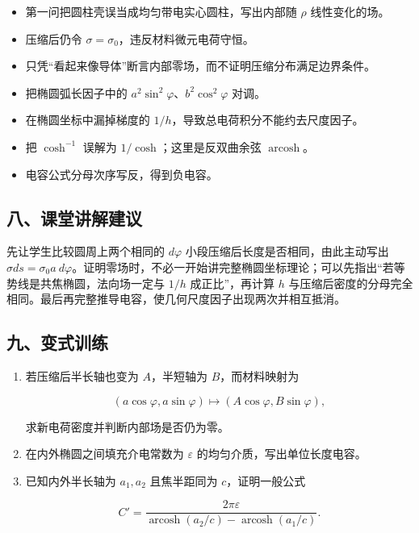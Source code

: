 \documentclass[12pt,a4paper,UTF8]{ctexart}
\newcommand{\tightlist}{\setlength{\itemsep}{0pt}\setlength{\parskip}{0pt}}
\begin{document}
\begin{itemize}
\tightlist
\item
  第一问把圆柱壳误当成均匀带电实心圆柱，写出内部随 \(\rho\)
  线性变化的场。
\item
  压缩后仍令 \(\sigma=\sigma_0\)，违反材料微元电荷守恒。
\item
  只凭``看起来像导体''断言内部零场，而不证明压缩分布满足边界条件。
\item
  把椭圆弧长因子中的 \(a^2\sin^2\varphi\)、\(b^2\cos^2\varphi\) 对调。
\item
  在椭圆坐标中漏掉梯度的 \(1/h\)，导致总电荷积分不能约去尺度因子。
\item
  把 \(\cosh^{-1}\) 误解为 \(1/\cosh\)；这里是反双曲余弦
  \(\operatorname{arcosh}\)。
\item
  电容公式分母次序写反，得到负电容。
\end{itemize}

\subsection{八、课堂讲解建议}\label{ux516bux8bfeux5802ux8bb2ux89e3ux5efaux8bae-4}

先让学生比较圆周上两个相同的 \(d\varphi\)
小段压缩后长度是否相同，由此主动写出
\(\sigma ds=\sigma_0a\ d\varphi\)。证明零场时，不必一开始讲完整椭圆坐标理论；可以先指出``若等势线是共焦椭圆，法向场一定与
\(1/h\) 成正比''，再计算 \(h\)
与压缩后密度的分母完全相同。最后再完整推导电容，使几何尺度因子出现两次并相互抵消。

\subsection{九、变式训练}\label{ux4e5dux53d8ux5f0fux8badux7ec3-4}

\begin{enumerate}
\def\labelenumi{\arabic{enumi}.}
\item
  若压缩后半长轴也变为 \(A\)，半短轴为 \(B\)，而材料映射为

  \[(a\cos\varphi,a\sin\varphi)
  \longmapsto(A\cos\varphi,B\sin\varphi),\]

  求新电荷密度并判断内部场是否仍为零。
\item
  在内外椭圆之间填充介电常数为 \(\varepsilon\)
  的均匀介质，写出单位长度电容。
\item
  已知内外半长轴为 \(a_1,a_2\) 且焦半距同为 \(c\)，证明一般公式

  \[C'=\frac{2\pi\varepsilon}
  {\operatorname{arcosh}(a_2/c)-\operatorname{arcosh}(a_1/c)}.\]
\end{enumerate}
\end{document}
